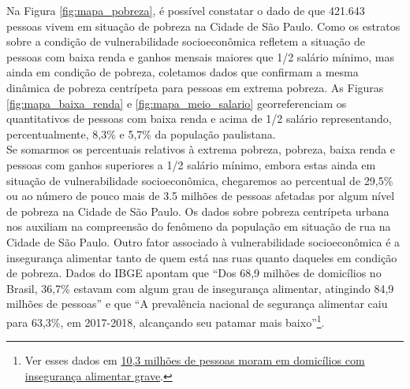 \documentclass[14pt]{extarticle}
\begin{document}
Na Figura \ref{fig:mapa_pobreza}, é possível constatar o dado de que 421.643 pessoas vivem em situação de pobreza na Cidade de São Paulo. Como os estratos sobre a condição de vulnerabilidade socioeconômica refletem a situação de pessoas com baixa renda e ganhos mensais maiores que 1/2 salário mínimo, mas ainda em condição de pobreza, coletamos dados que confirmam a mesma dinâmica de pobreza centrípeta para pessoas em extrema pobreza. As Figuras \ref{fig:mapa_baixa_renda} e \ref{fig:mapa_meio_salario} georreferenciam os quantitativos de pessoas com baixa renda e acima de 1/2 salário representando, percentualmente, 8,3\% e 5,7\% da população paulistana.\\

Se somarmos os percentuais relativos à extrema pobreza, pobreza, baixa renda e pessoas com ganhos superiores a 1/2 salário mínimo, embora estas ainda em situação de vulnerabilidade socioeconômica, chegaremos ao percentual de 29,5\% ou ao número de pouco mais de 3.5 milhões de pessoas afetadas por algum nível de pobreza na Cidade de São Paulo. Os dados sobre pobreza centrípeta urbana nos auxiliam na compreensão do fenômeno da população em situação de rua na Cidade de São Paulo. Outro fator associado à vulnerabilidade socioeconômica é a insegurança alimentar tanto de quem está nas ruas quanto daqueles em condição de pobreza. Dados do IBGE apontam que ``Dos 68,9 milhões de domicílios no Brasil, 36,7\% estavam com algum grau de insegurança alimentar, atingindo 84,9 milhões de pessoas'' e  que ``A prevalência nacional de segurança alimentar caiu para 63,3\%, em 2017-2018, alcançando seu patamar mais baixo''\footnote{Ver esses dados  em \href{https://agenciadenoticias.ibge.gov.br/agencia-noticias/2012-agencia-de-noticias/noticias/28903-10-3-milhoes-de-pessoas-moram-em-domicilios-com-inseguranca-alimentar-grave}{10,3 milhões de pessoas moram em domicílios com insegurança alimentar grave}.}.
\end{document}
